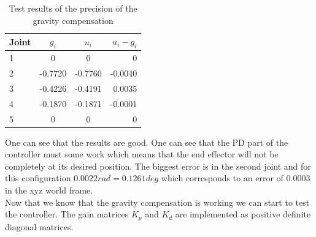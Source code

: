 \begin{table}[htbp]
\centering
\caption{Test results of the precision of the gravity compensation}
\label{table:gravity}
    \begin{tabular}{l c c r}
        \toprule
        Joint  &  $g_i$ & $u_i$ & $u_i-g_i$\\
        \midrule
        1 & 0 & 0 & 0\\
        2 & -0.7720  & -0.7760  & -0.0040 \\
        3 &-0.4226 & -0.4191 & 0.0035 \\
        4 & -0.1870 &-0.1871 & -0.0001\\
        5 & 0 & 0 & 0\\
        \bottomrule
    \end{tabular}
\end{table}

 One can see that the results are good. One can see that the PD part of the controller must some work which means that the end effector will not be completely at its desired position. The biggest error is in the second joint and for this configuration $0.0022 rad = 0.1261 deg$ which corresponds to an error of $0.0003$ in the xyz world frame. \\
 
Now that we know that the gravity compensation is working we can start to test the controller. The gain matrices $K_p$ and $K_d$ are implemented as positive definite diagonal matrices.

